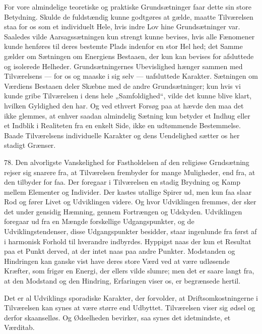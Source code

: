 \documentclass[12pt,a4paper,openany]{book}
\newcommand{\opage}[1]{\marginnote{\footnotesize\textit{[#1]}}}
\begin{document}
For vore almindelige teoretiske og praktiske Grundsætninger faar dette
sin store Betydning. Skulde de fuldstændig kunne godtgøres at gælde,
maatte Tilværelsen staa for os som et individuelt Hele, hvis indre Lov
hine Grundsætninger var. Saaledes vilde Aarsagssætningen kun strengt
kunne bevises, hvis alle Fænomener kunde henføres til deres bestemte
Plads indenfor en stor Hel%
\opage{180}hed; det Samme gælder om Sætningen om Energiens Bestaaen, der
kun kan bevises for afsluttede og isolerede Helheder. Grundsætningernes
Ubevislighed hænger sammen med Tilværelsens --- for os og maaske i sig
selv --- uafsluttede Karakter. Sætningen om Værdiens Bestaaen deler
Skæbne med de andre Grundsætninger; kun hvis vi kunde gribe Tilværelsen
i dens hele „Samfoldighed“, vilde det kunne blive klart, hvilken
Gyldighed den har. Og ved ethvert Forsøg paa at hævde den maa det ikke
glemmes, at enhver saadan almindelig Sætning kun betyder et Indhug eller
et Indblik i Realiteten fra en enkelt Side, ikke en udtømmende
Bestemmelse. Baade Tilværelsens individuelle Karakter og dens
Uendelighed sætter os her stadigt Grænser.

78. Den alvorligste Vanskelighed for Fastholdelsen af den religiøse
Grndsætning rejser sig snarere fra, at Tilværelsen frembyder for mange
Muligheder, end fra, at den tilbyder for faa. Der foregaar i Tilværelsen
en stadig Brydning og Kamp mellem Elementer og Individer. Der kastes
utallige Spirer ud, men kun faa slaar Rod og fører Livet og Udviklingen
videre. Og hvor Udviklingen fremmes, der sker det under gensidig
Hæmning, gennem Fortrængen og Udskyden. Udviklingen foregaar ud fra en
Mængde forskellige Udgangspunkter, og de Udviklingstendenser, disse
Udgangspunkter besidder, staar ingenlunde fra først af i harmonisk
Forhold til hverandre indbyrdes. Hyppigst naas der kun et Resultat paa
et Punkt derved, at der intet naas paa andre Punkter. Modstanden og
Hindringen kan ganske vist have deres store Værd ved at være udløsende
Kræfter, som frigør en Energi, der ellers vilde slumre; men det er saare
langt fra, at den Modstand og den Hindring, Erfaringen viser os, er
begrænsede hertil.

Det er al Udviklings sporadiske Karakter, der forvolder, at
Driftsomkostningerne i Tilværelsen kan synes at være større end
Udbyttet. Tilværelsen viser sig ødsel og derfor skaanselløs. Og
Ødselheden bevirker, saa synes det idetmindste, et Værditab.
\end{document}
